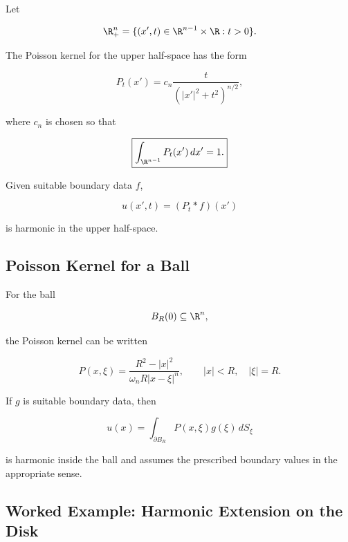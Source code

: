Let

\[
\R_+^n
=
\{
(x',t)\in\R^{n-1}\times\R:t>0
\}.
\]

The Poisson kernel for the upper half-space has the form

\[
\boxed{
P_t(x')
=
c_n
\frac{t}
{\left(|x'|^2+t^2\right)^{n/2}},
}
\]

where \(c_n\) is chosen so that

\[
\boxed{
\int_{\R^{n-1}}P_t(x')\,dx'=1.
}
\]

Given suitable boundary data \(f\),

\[
\boxed{
u(x',t)
=
(P_t*f)(x')
}
\]

is harmonic in the upper half-space.

\subsection{Poisson Kernel for a Ball}
\label{subsec:poisson-kernel-ball}

For the ball

\[
B_R(0)\subseteq\R^n,
\]

the Poisson kernel can be written

\[
\boxed{
P(x,\xi)
=
\frac{R^2-|x|^2}
{\omega_nR|x-\xi|^n},
\qquad
|x|<R,
\quad
|\xi|=R.
}
\]

If \(g\) is suitable boundary data, then

\[
\boxed{
u(x)
=
\int_{\partial B_R}
P(x,\xi)g(\xi)\,dS_\xi
}
\]

is harmonic inside the ball and assumes the prescribed boundary values
in the appropriate sense.

\subsection{Worked Example: Harmonic Extension on the Disk}
\label{subsec:worked-harmonic-extension-disk}


